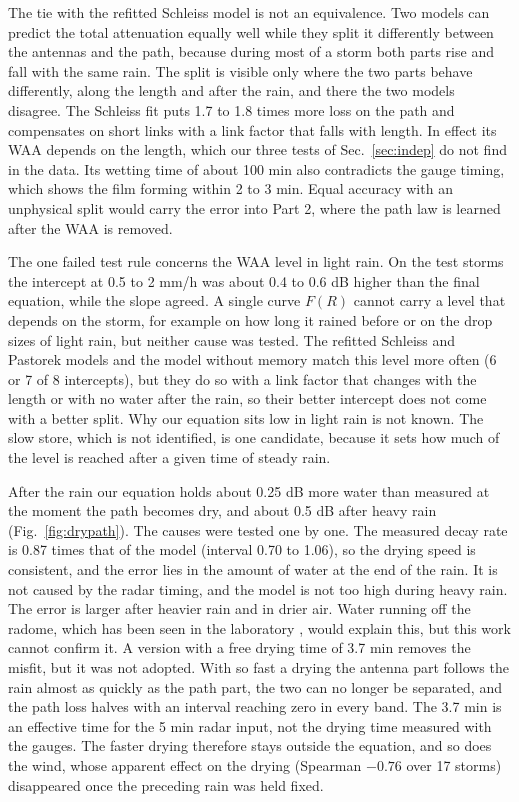 \documentclass[reprint,aps,pra,amsmath,amssymb,nofootinbib,superscriptaddress]{revtex4-2}
\begin{document}
The tie with the refitted Schleiss model is not an equivalence. Two models can predict the total attenuation equally well
while they split it differently between the antennas and the path, because during most of a storm both parts rise and fall
with the same rain. The split is visible only where the two parts behave differently, along the length and after the rain,
and there the two models disagree. The Schleiss fit puts 1.7 to 1.8 times more loss on the path and compensates on short
links with a link factor that falls with length. In effect its WAA depends on the length, which our three tests
of Sec.~\ref{sec:indep} do not find in the data. Its
wetting time of about 100 min also contradicts the gauge timing, which shows the film forming within 2 to 3 min. Equal
accuracy with an unphysical split would carry the error into Part 2, where the path law is learned after the WAA is
removed.

The one failed test rule concerns the WAA level in light rain. On the test storms the intercept at 0.5 to 2 mm/h was about
0.4 to 0.6 dB higher than the final equation, while the slope agreed. A single curve $F(R)$ cannot carry a level that
depends on the storm, for example on how long it rained before or on the drop sizes of light rain, but neither cause was
tested. The refitted Schleiss and Pastorek models and the model without memory match this level more often (6 or 7 of 8
intercepts), but they do so with a link factor that changes with the length or with no water after the rain, so their
better intercept does not come with a better split. Why our equation sits low in light rain is not known. The slow store,
which is not identified, is one candidate, because it sets how much of the level is reached after a given time of steady
rain.

After the rain our equation holds about 0.25 dB more water than measured at the moment the path becomes dry, and about
0.5 dB after heavy rain (Fig.~\ref{fig:drypath}). The causes were tested one by one. The measured decay rate is 0.87 times
that of the model (interval 0.70 to 1.06), so the drying speed is consistent, and the error lies in the amount of water at
the end of the rain. It is not caused by the radar timing, and the model is not too high during heavy rain. The error is
larger after heavier rain and in drier air. Water running off the radome, which has been seen in the laboratory
\cite{tiede2025}, would explain this, but this work cannot confirm it. A version with a free drying time of 3.7 min removes
the misfit, but it was not adopted. With so fast a drying the antenna part follows the rain almost as quickly as the path
part, the two can no longer be separated, and the path loss halves with an interval reaching zero in every band. The
3.7 min is an effective time for the 5 min radar input, not the drying time measured with the gauges. The faster drying
therefore stays outside the equation, and so does the wind, whose apparent effect on the drying (Spearman $-0.76$ over 17
storms) disappeared once the preceding rain was held fixed.
\end{document}
